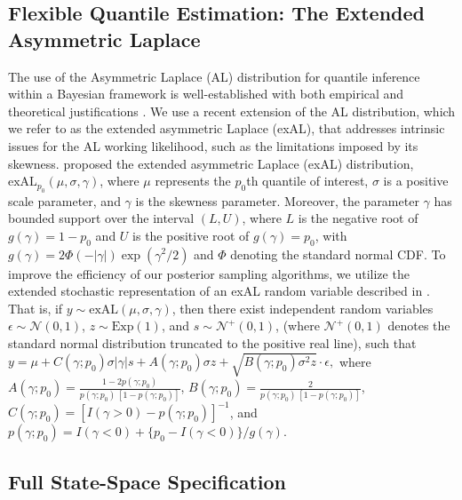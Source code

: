 \documentclass[APA,STIX1COL]{WileyNJD-v2}
\begin{document}
\subsection{Flexible Quantile Estimation: The Extended Asymmetric Laplace}
\label{subsec:exal}

The use of the Asymmetric Laplace (AL) distribution for quantile inference within a Bayesian framework is well-established with both empirical and theoretical justifications \citep{yu2001bayesian, sriram2013theoretical}. We use a recent extension of the AL distribution, which we refer to as the extended asymmetric Laplace (exAL), that addresses intrinsic issues for the AL working likelihood, such as the limitations imposed by its skewness. \citet{yan2025new} proposed the extended asymmetric Laplace (exAL) distribution, $\text{exAL}_{p_0}(\mu, \sigma, \gamma)$, where $\mu$ represents the $p_0$th quantile of interest, $\sigma$ is a positive scale parameter, and $\gamma$ is the skewness parameter. Moreover, the parameter $\gamma$ has bounded support over the interval $(L, U)$, where $L$ is the negative root of $g(\gamma) = 1 - p_0$ and $U$ is the positive root of $g(\gamma) = p_0$, with $g(\gamma) = 2 \Phi(-|\gamma|) \exp(\gamma^2 / 2)$ and $\Phi$ denoting the standard normal CDF. To improve the efficiency of our posterior sampling algorithms, we utilize the extended stochastic representation of an exAL random variable described in \citet{yan2025new}. That is, if $y \sim \text{exAL}(\mu, \sigma, \gamma)$, then there exist independent random variables $\epsilon \sim \mathcal{N}(0, 1)$, $z \sim \text{Exp}(1)$, and $s \sim \mathcal{N}^+(0, 1)$, (where $\mathcal{N}^+(0, 1)$ denotes the standard normal distribution truncated to the positive real line), such that  \( y = \mu + C(\gamma; p_0)\sigma |\gamma| s + A(\gamma; p_0) \sigma z + \sqrt{B(\gamma; p_0) \sigma^2 z} \cdot \epsilon, \) where $A(\gamma; p_0) = \frac{1 - 2 p(\gamma; p_0)}{p(\gamma; p_0) \, [1 - p(\gamma; p_0)]}$, $B(\gamma; p_0) = \frac{2}{p(\gamma; p_0) \, [1 - p(\gamma; p_0)]}$, $C(\gamma; p_0) = [I(\gamma > 0) - p(\gamma; p_0)]^{-1}$, and $p(\gamma; p_0) = I(\gamma < 0) + \{p_0 - I(\gamma < 0)\} / g(\gamma)$.


\subsection{Full State-Space Specification}
\label{subsec:fullstatespace}
\end{document}
